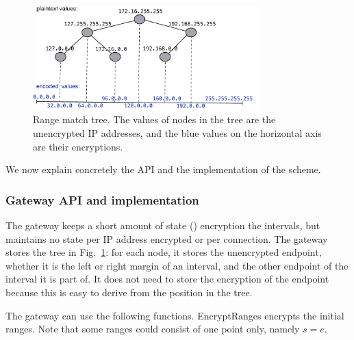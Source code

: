 \begin{figure}
  \includegraphics[width=3.45in]{fig/tree}
  \caption{\label{fig:tree} Range match tree. The values of nodes in the tree are the unencrypted IP addresses, and the blue values on the horizontal axis are their encryptions. }
\end{figure}



We now explain concretely the API and the implementation of the scheme. 

\subsubsection{Gateway API and implementation}\label{s:rangealg}

 The gateway keeps a short amount of state () encryption the intervals, but maintains no state per IP address encrypted or per connection. The gateway stores the tree in Fig.~\ref{fig:tree}: for each node, it stores the unencrypted endpoint, whether it is the left or  right margin of an interval, and the other endpoint of the interval it is part of. It does not need to store the encryption of the endpoint because this is easy to derive from the position in the tree. 


The gateway can use the following functions. EncryptRanges encrypts the initial ranges. Note that some ranges could consist of
one point only, namely $s = e$. 



